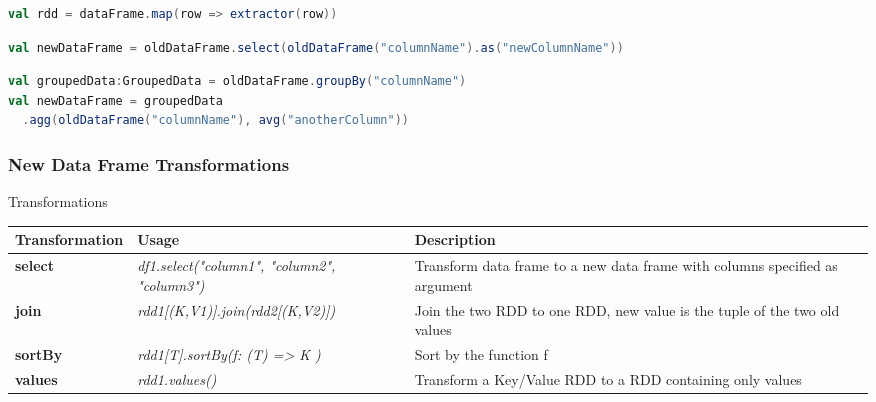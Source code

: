 \documentclass[slidetop,9pt,utf8]{beamer}
\begin{document}
\begin{CJK}{UTF8}{gbsn}
\begin{frame}[fragile]
  \begin{lstlisting}[label=DataFrameToRDD, caption=Transform a Data Frame to RDD, language=scala, style=code]
val rdd = dataFrame.map(row => extractor(row))
  \end{lstlisting}

  \begin{lstlisting}[label=changeNameSelectedColumn, caption=Change name of a column, language=scala, style=code]
val newDataFrame = oldDataFrame.select(oldDataFrame("columnName").as("newColumnName"))
  \end{lstlisting}

  \begin{lstlisting}[label=GroupByColumn, caption=Group By Column, language=scala, style=code]
val groupedData:GroupedData = oldDataFrame.groupBy("columnName")
val newDataFrame = groupedData
  .agg(oldDataFrame("columnName"), avg("anotherColumn"))
  \end{lstlisting}

\end{frame}

\begin{frame}

  \frametitle{New Data Frame Transformations}

  \begin{block}{Transformations}
    \begin{center}
      \begin{tabular}{|m{2.1cm}|m{3.5cm}|m{5cm}|}
        \hline 
        \rowcolor{gray} \textbf{Transformation} & \textbf{Usage} & \textbf{Description} \\ \hline
        \textbf{select} & \textit{df1.select("column1", "column2", "column3")} & Transform data frame to a new data frame with columns specified as argument \\ \hline
        \textbf{join} & \textit{rdd1[(K,V1)]\newline  .join(rdd2[(K,V2)])} & Join the two RDD to one RDD, new value is the tuple of the two old values \\ \hline
        \textbf{sortBy} & \textit{rdd1[T]\newline  .sortBy(f: (T) =\textgreater\xspace K )} & Sort by the function f \\ \hline
        \textbf{values} & \textit{rdd1.values()} & Transform a Key/Value RDD to a RDD containing only values \\ \hline
      \end{tabular}
    \end{center}
  \end{block}


\end{frame}
\end{CJK}
\end{document}
